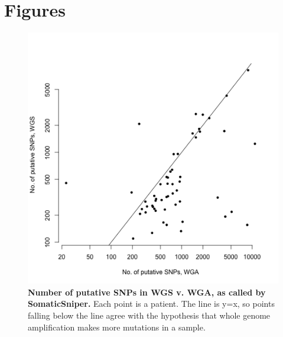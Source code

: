 \documentclass[11pt]{article} %
\begin{document}


\section{Figures}

\begin{figure}
\includegraphics[scale=1.0]{C282_v_C484.png}
\caption{\textbf{Number of putative SNPs in WGS v. WGA, as called by SomaticSniper.} Each point is a patient. The line is y=x, so points falling below the line agree with the hypothesis that whole genome amplification makes more mutations in a sample.}
\end{figure}
\end{document}
